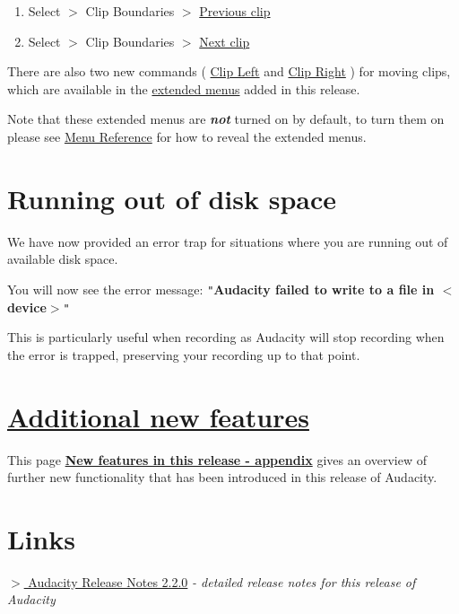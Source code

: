 \documentclass[]{book}
\begin{document}
\begin{multicols}{2}
\begin{enumerate}
\item Select \mbox{$>$} Clip Boundaries \mbox{$>$} 
\hyperref[select_menu_clip_boundaries__previous_clip]{Previous clip}
 
\item Select \mbox{$>$} Clip Boundaries \mbox{$>$} 
\hyperref[select_menu_clip_boundaries__next_clip]{Next clip}
 
\end{enumerate}
There are also two new commands (
\hyperref[ext_command_menu_cursor__clip_left]{Clip Left}
 and 
\hyperref[ext_command_menu_cursor__clip_right]{Clip Right}
) for moving clips, which are available in the 
\hyperref[_extendedmenubar]{extended menus}
 added in this release.

Note that these extended menus are \textit{\textbf{not}} turned on by default, to turn them on please see 
\hyperref[menu_reference__the_extended_menu_bar]{Menu Reference}
 for how to reveal the extended menus.



\section{Running out of disk space}


We have now provided an error trap for situations where you are running out of available disk space.

You will now see the error message:
\texttt{{}"{}}\textbf{Audacity failed to write to a file in \mbox{$<$}device\mbox{$>$}}\texttt{{}"{}}

This is particularly useful when recording as Audacity will stop recording when the error is trapped, preserving your recording up to that point.



\section{
\hyperref[new_features_in_this_release_appendix_]{Additional new features}
}


This page \textbf{
\hyperref[new_features_in_this_release_appendix_]{New features in this release - appendix}
} gives an overview of further new functionality that has been introduced in this release of Audacity.



\section{Links}



\hyperref[https:__wiki.audacityteam.org_wiki_Release_Notes_2.2.0]{\textbf{\mbox{$>$}} Audacity Release Notes 2.2.0}
 \textit{- detailed release notes for this release of Audacity}
																																								\end{multicols}		
																					
\end{document}
